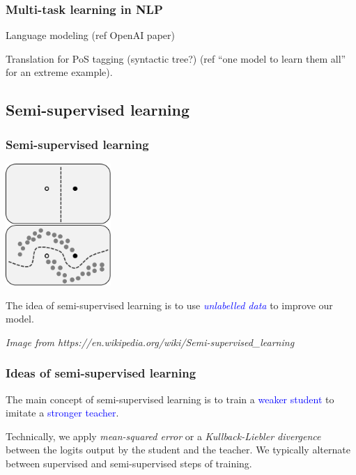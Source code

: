 \documentclass[10pt]{beamer}
\begin{document}
\begin{frame}
  \frametitle{Multi-task learning in NLP}

  Language modeling (ref OpenAI paper)

  \bigskip

  Translation for PoS tagging (syntactic tree?) (ref ``one model to
  learn them all'' for an extreme example).
\end{frame}

\subsection{Semi-supervised learning}

\begin{frame}

  \frametitle{Semi-supervised learning}

  \begin{center}
    \includegraphics[width=4cm]{images/semi_supervised_learning.png}
  \end{center}

  \bigskip

  The idea of semi-supervised learning is to use
  \textcolor{blue}{\emph{unlabelled data}} to improve our model.

  \bigskip

  {\scriptsize \textit{Image from https://en.wikipedia.org/wiki/Semi-supervised\_learning}}
\end{frame}

\begin{frame}

  \frametitle{Ideas of semi-supervised learning}

  The main concept of semi-supervised learning is to train a
  \textcolor{blue}{weaker student} to imitate a
  \textcolor{blue}{stronger teacher}.

  \bigskip

  Technically, we apply \emph{mean-squared error} or a
  \emph{Kullback-Liebler divergence} between the logits output by the
  student and the teacher. We typically alternate between supervised
  and semi-supervised steps of training.

\end{frame}
\end{document}
